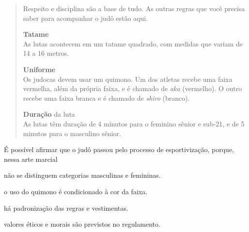 \begin{quote}
Respeito e disciplina são a base de tudo. As outras regras que você
precisa saber para acompanhar o judô estão aqui.

\textbf{Tatame}\\
As lutas acontecem em um tatame quadrado, com medidas que variam de 14 a
16 metros.

\textbf{Uniforme}\\
Os judocas devem usar um quimono. Um dos atletas recebe uma faixa
vermelha, além da própria faixa, e é chamado de \textit{aka} (vermelho). O outro
recebe uma faixa branca e é chamado de \textit{shiro} (branco).

\textbf{Duração} da luta\\
As lutas têm duração de 4 minutos para o feminino sênior e sub-21, e de
5 minutos para o masculino sênior.

\end{quote}

\pagebreak
É possível afirmar que o judô passou pelo processo de esportivização,
porque, nessa arte marcial 

\begin{escolha}
\item não se distinguem categorias masculinas e femininas. 

\item o uso do quimono é condicionado à cor da faixa.

\item há padronização das regras e vestimentas.

\item valores éticos e morais são previstos no regulamento.
\end{escolha}



